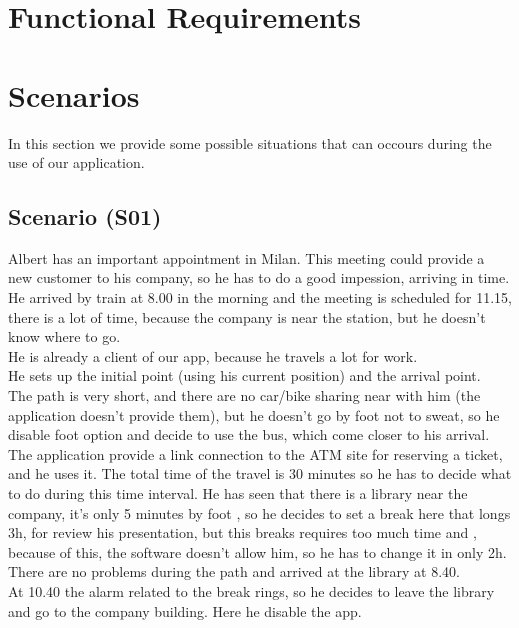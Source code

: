 \documentclass[a4paper,leqno]{book}
\begin{document}
\section{Functional Requirements}


\section{Scenarios}
In this section we provide some possible situations that can occours during the use of our application.

\subsection{Scenario (S01) }
Albert has an important appointment in Milan. 
This meeting could provide a new customer to his company, so he has to do a good impession, arriving in time.\\
He arrived by train at 8.00 in the morning and the meeting is scheduled for 11.15, there is a lot of time, because 
the company is near the station, but he doesn't know where to go.\\
He is already a client of our app, because he travels a lot for work.\\
He sets up the initial point (using his current position) and the arrival point.\\
The path is very short, and there are no car/bike sharing near with him (the application doesn't provide them), but he doesn't go by foot not to sweat,
so he disable foot option and decide to use the bus, which come closer to his arrival.\\
The application provide a link connection to the ATM site for reserving a ticket, and he uses it.
The total time of the travel is 30 minutes so he has to decide what to do during this time interval.
He has seen that there is a library near the company, it's only 5 minutes by foot , so he decides to set a break here that longs 3h, for review his presentation,
but this breaks requires too much time and , because of this, the software doesn't allow him, so he has to change it in only 2h.
There are no problems during the path and arrived at the library at 8.40.\\
At 10.40 the alarm related to the break rings, so he decides to leave the library and go to the company building. 
Here he disable the app.
\end{document}
